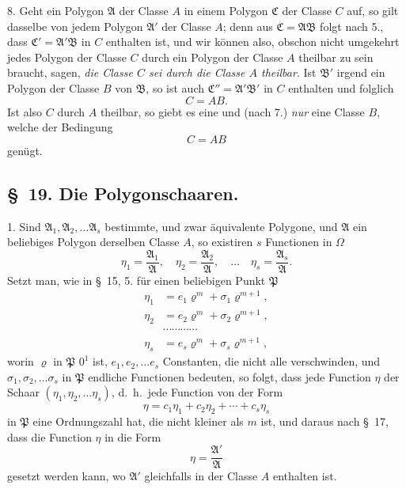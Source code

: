 \documentclass{article}
\begin{document}

8. Geht ein Polygon $\mathfrak{A}$ der Classe $A$ in einem Polygon $\mathfrak{C}$ der Classe $C$ auf, so gilt dasselbe von jedem Polygon $\mathfrak{A}'$ der Classe $A$; denn aus $\mathfrak{C} = \mathfrak{A}\mathfrak{B}$ folgt nach 5., dass $\mathfrak{C}' = \mathfrak{A}'\mathfrak{B}$ in $C$ enthalten ist, und wir können also, obschon nicht umgekehrt jedes Polygon der Classe $C$ durch ein Polygon der Classe $A$ theilbar zu sein braucht, sagen, \emph{die Classe $C$ sei durch die Classe $A$ theilbar}. Ist $\mathfrak{B}'$ irgend ein Polygon der Classe $B$ von $\mathfrak{B}$, so ist auch $\mathfrak{C}'' = \mathfrak{A}'\mathfrak{B}'$ in $C$ enthalten und folglich
\[ C = AB. \]
Ist also $C$ durch $A$ theilbar, so giebt es eine und (nach 7.) \emph{nur} eine Classe $B$, welche der Bedingung
\[ C = AB \]
genügt.

\subsection*{§~19. Die Polygonschaaren.}

1. Sind $\mathfrak{A}_{1}, \mathfrak{A}_{2}, \ldots \mathfrak{A}_{s}$ bestimmte, und zwar äquivalente Polygone, und $\mathfrak{A}$ ein beliebiges Polygon derselben Classe $A$, so existiren $s$ Functionen in $\Omega$
\[ \eta_{1} = \frac{\mathfrak{A}_{1}}{\mathfrak{A}}, \quad \eta_{2} = \frac{\mathfrak{A}_{2}}{\mathfrak{A}}, \quad \ldots \quad \eta_{s} = \frac{\mathfrak{A}_{s}}{\mathfrak{A}}. \]
Setzt man, wie in §~15, 5. für einen beliebigen Punkt $\mathfrak{P}$
\[ \begin{aligned} \eta_{1} &= e_{1}\varrho^{m} + \sigma_{1}\varrho^{m+1}, \\ \eta_{2} &= e_{2}\varrho^{m} + \sigma_{2}\varrho^{m+1}, \\ &\cdots\cdots\cdots\cdots \\ \eta_{s} &= e_{s}\varrho^{m} + \sigma_{s}\varrho^{m+1}, \end{aligned} \]
worin $\varrho$ in $\mathfrak{P}$ $0^{1}$ ist, $e_{1}, e_{2}, \ldots e_{s}$ Constanten, die nicht alle verschwinden, und $\sigma_{1}, \sigma_{2}, \ldots \sigma_{s}$ in $\mathfrak{P}$ endliche Functionen bedeuten, so folgt, dass jede Function $\eta$ der Schaar $(\eta_{1}, \eta_{2}, \ldots \eta_{s})$, d.\ h.\ jede Function von der Form
\[ \eta = c_{1}\eta_{1} + c_{2}\eta_{2} + \cdots + c_{s}\eta_{s} \]
in $\mathfrak{P}$ eine Ordnungszahl hat, die nicht kleiner als $m$ ist, und daraus nach §~17, dass die Function $\eta$ in die Form
\[ \eta = \frac{\mathfrak{A}'}{\mathfrak{A}} \]
gesetzt werden kann, wo $\mathfrak{A}'$ gleichfalls in der Classe $A$ enthalten ist.
\end{document}
